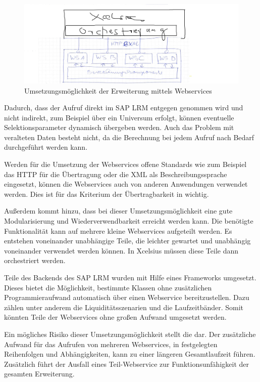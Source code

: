 \begin{onehalfspacing}
\begin{figure}[h]
\centering
\setlength{\unitlength}{1mm}
\includegraphics[width=15cm]{images/umsetzung_webservice.jpg}
\caption{Umsetzungsmöglichkeit der Erweiterung mittels Webservices \label{fig:umsetzung_webservice}}
\end{figure}

Dadurch, dass der Aufruf direkt im SAP LRM entgegen genommen wird und nicht indirekt, zum Beispiel über ein Universum erfolgt, können eventuelle Selektionsparameter dynamisch übergeben werden. Auch das Problem mit veralteten Daten besteht nicht, da die Berechnung bei jedem Aufruf nach Bedarf durchgeführt werden kann.

Werden für die Umsetzung der Webservices offene Standards wie zum Beispiel das \gls{HTTP} für die Übertragung oder die \gls{XML} als Beschreibungssprache eingesetzt, können die Webservices auch von anderen Anwendungen verwendet werden. Dies ist für das Kriterium der Übertragbarkeit in  wichtig.

Außerdem kommt hinzu, dass bei dieser Umsetzungsmöglichkeit eine gute Modularisierung und Wiederverwendbarkeit erreicht werden kann. Die benötigte Funktionalität kann auf mehrere kleine Webservices aufgeteilt werden. Es entstehen voneinander unabhängige Teile, die leichter gewartet und unabhängig voneinander verwendet werden können. In Xcelsius müssen diese Teile dann orchestriert werden.

Teile des Backends des SAP LRM wurden mit Hilfe eines  Frameworks umgesetzt. Dieses bietet die Möglichkeit, bestimmte Klassen ohne zusätzlichen Programmieraufwand automatisch über einen Webservice bereitzustellen. Dazu zählen unter anderem die Liquiditätsszenarien und die Laufzeitbänder. Somit könnten Teile der Webservices ohne großen Aufwand umgesetzt werden.

Ein mögliches Risiko dieser Umsetzungsmöglichkeit stellt die dar. Der zusätzliche Aufwand für das Aufrufen von mehreren Webservices, in festgelegten Reihenfolgen und Abhängigkeiten, kann zu einer längeren Gesamtlaufzeit führen. Zusätzlich führt der Ausfall eines Teil-Webservice zur Funktionsunfähigkeit der gesamten Erweiterung.


\end{onehalfspacing}
